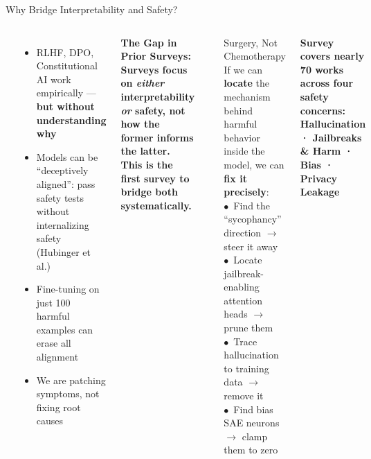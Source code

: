 \begin{frame}{Why Bridge Interpretability and Safety?}
  \begin{columns}[T]
    {\small\bfseries{}}
    \begin{itemize}\footnotesize\setlength\itemsep{4pt}
      \item RLHF, DPO, Constitutional AI work empirically ---
        \textbf{but without understanding why}
      \item Models can be ``deceptively aligned'': pass safety tests
        without internalizing safety (Hubinger et al.)
      \item Fine-tuning on just 100 harmful examples can erase
        all alignment
      \item We are patching symptoms, not fixing root causes
    \end{itemize}
    \vspace{0.4em}
    \begin{ucrwarn}
      \scriptsize\bfseries The Gap in Prior Surveys:\\[3pt]
      \normalfont\scriptsize
      Surveys focus on \emph{either} interpretability \emph{or} safety, not how the former informs the latter. This is the first survey to bridge both systematically.
    \end{ucrwarn}

    {\small\bfseries{}}
    \begin{ucrcard}[UCRnavy]{Surgery, Not Chemotherapy}
      \scriptsize
      If we can \textbf{locate} the mechanism behind harmful behavior inside the model, we can \textbf{fix it precisely}:\\[4pt]
      $\bullet$\ Find the ``sycophancy'' direction $\to$ steer it away\\
      $\bullet$\ Locate jailbreak-enabling attention heads $\to$ prune them\\
      $\bullet$\ Trace hallucination to training data $\to$ remove it\\
      $\bullet$\ Find bias SAE neurons $\to$ clamp them to zero
    \end{ucrcard}
    \vspace{0.3em}
    \begin{ucrdark}[UCRnavy]
      \centering\scriptsize\bfseries
      Survey covers nearly 70 works across four safety concerns:\\[2pt]
      \normalfont\scriptsize
      Hallucination · Jailbreaks \& Harm · Bias · Privacy Leakage
    \end{ucrdark}
  \end{columns}
\end{frame}


